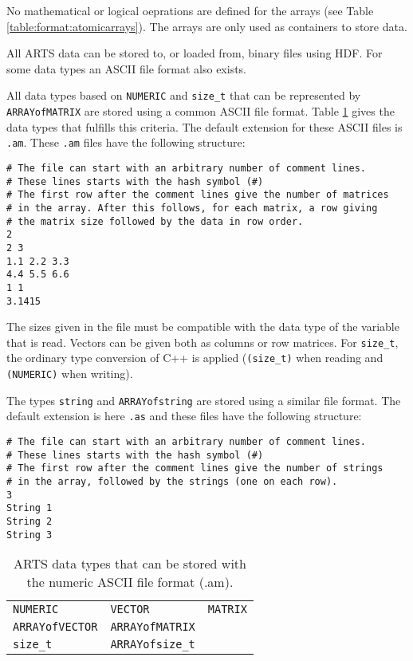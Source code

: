  No mathematical or logical oeprations are defined for the arrays (see
 Table \ref{table:format:atomicarrays}). The arrays are only used as
 containers to store data.


 \label{sec:formats:files}

 All ARTS data can be stored to, or loaded from, binary files using HDF.
 For some data types an ASCII file format also exists.
 
  \label{sec:formats:file:ascii}
  
  All data types based on \verb|NUMERIC| and \verb|size_t| that can be
  represented by \verb|ARRAYofMATRIX| are stored using a common ASCII
  file format. Table \ref{table:format:am} gives the data types that
  fulfills this criteria. The default extension for these ASCII files 
  is \verb|.am|.  These \verb|.am| files have the following 
  structure: \\
  {\footnotesize \begin{verbatim} 
# The file can start with an arbitrary number of comment lines.  
# These lines starts with the hash symbol (#) 
# The first row after the comment lines give the number of matrices 
# in the array. After this follows, for each matrix, a row giving 
# the matrix size followed by the data in row order.  
2 
2 3 
1.1 2.2 3.3 
4.4 5.5 6.6 
1 1 
3.1415
 \end{verbatim} 
}
     
 The sizes given in the file must be compatible with the data type
 of the variable that is read. Vectors can be given both as
 columns or row matrices. For \verb|size_t|, the ordinary type
 conversion of C++ is applied (\verb|(size_t)| when reading and
 \verb|(NUMERIC)| when writing).
 
 The types \verb|string| and \verb|ARRAYofstring| are stored using a
 similar file format. The default extension is here \verb|.as| and
 these files have the following structure:
 {\footnotesize \begin{verbatim} 
# The file can start with an arbitrary number of comment lines.
# These lines starts with the hash symbol (#)
# The first row after the comment lines give the number of strings
# in the array, followed by the strings (one on each row).  
3
String 1
String 2
String 3
 \end{verbatim} 
}


 \begin{table}[t]
  \begin{tabular}{p{4.5cm} p{4.5cm} p{4.5cm}}
   \verb|NUMERIC|        & \verb|VECTOR|         & \verb|MATRIX|          \\
   \verb|ARRAYofVECTOR|  & \verb|ARRAYofMATRIX|  &                        \\
   \verb|size_t|         & \verb|ARRAYofsize_t|  &                        \\
  \end{tabular}
  \caption{ARTS data types that can be stored with the numeric ASCII
           file format (.am).}
  \label{table:format:am}
 \end{table}
 

